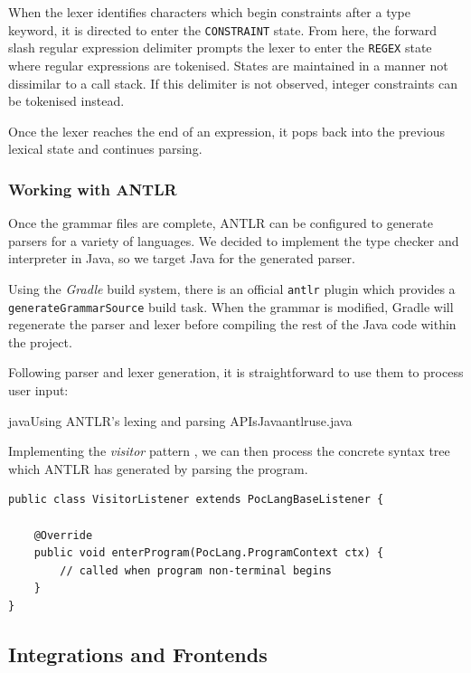\documentclass[a4paper,openany,12pt]{book}
\begin{document}
When the lexer identifies characters which begin constraints after a type keyword, it is directed to enter the
\texttt{CONSTRAINT} state.
From here, the forward slash regular expression delimiter prompts the lexer to enter the \texttt{REGEX} state where
regular expressions are tokenised.
States are maintained in a manner not dissimilar to a call stack.
If this delimiter is not observed, integer constraints can be tokenised instead.

Once the lexer reaches the end of an expression, it pops back into the previous lexical state and continues parsing.

\subsubsection{Working with ANTLR}

Once the grammar files are complete, ANTLR can be configured to generate parsers for a variety of languages.
We decided to implement the type checker and interpreter in Java, so we target Java for the generated parser.

Using the \emph{Gradle} build system, there is an official \texttt{antlr} plugin which provides a
\texttt{generateGrammarSource} build task.
When the grammar is modified, Gradle will regenerate the parser and lexer before compiling the rest of the Java
code within the project.

Following parser and lexer generation, it is straightforward to use them to process user input:

\begin{mycodefile}{java}{\label{code:antlr:2}Using ANTLR's lexing and parsing APIs}{Java}{antlruse.java}
    \vspace{0.5em}

    Implementing the \emph{visitor} pattern \citep{gof1995}, we can then process the concrete syntax tree which ANTLR
    has generated by parsing the program.
    \vspace{0.5em}

    \begin{verbatim}
public class VisitorListener extends PocLangBaseListener {

    @Override
    public void enterProgram(PocLang.ProgramContext ctx) {
        // called when program non-terminal begins
    }
}
    \end{verbatim}
\end{mycodefile}


\subsection{Integrations and Frontends}
\end{document}
